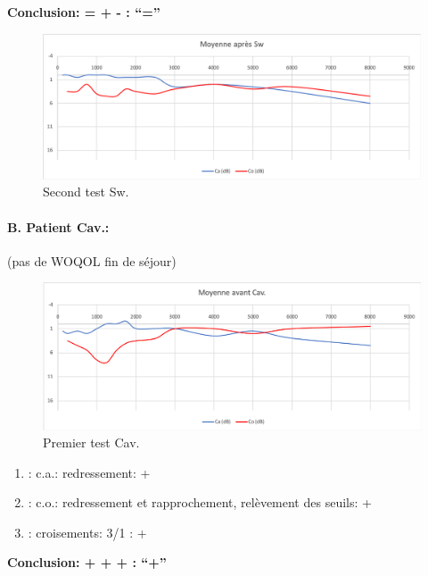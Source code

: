                 \textbf{  Conclusion:  = +  -        : ``=''}

                \begin{figure}
\centering
\includegraphics[width=0.7\linewidth]{images/graphiques/sw_post.png}
\caption[Moyenne OG+OD]{Second test Sw.}
       
\label{groupecontroleimage1}
\end{figure}




\paragraph{B. Patient Cav.: }

(pas de WOQOL fin de séjour)


\begin{figure}[th]
\centering
\includegraphics[width=0.7\linewidth]{images/graphiques/cav_pre.png}
\caption[Moyenne OG+OD]{Premier test Cav.}
       
\label{groupecontroleimage1}
\end{figure}

	\begin{enumerate}
 		
 		\item : c.a.: redressement: +
                
 		\item : c.o.: redressement et rapprochement, relèvement des seuils: +
 		\item : croisements: 3/1 :  +
                  
                \end{enumerate}

                \textbf{  Conclusion:  + + +       : ``+''}

